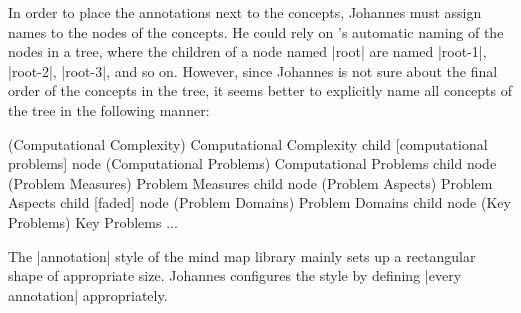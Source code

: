 In order to place the annotations next to the concepts, Johannes must
assign names to the nodes of the concepts. He could rely on
\tikzname's automatic naming of the nodes in a tree, where the
children of a node named |root| are named |root-1|, |root-2|,
|root-3|, and so on. However, since Johannes is not sure about the
final order of the concepts in the tree, it seems better to explicitly
name all concepts of the tree in the following manner:

\begin{codeexample}
 (Computational Complexity) {Computational Complexity} 
  child [computational problems] { node (Computational Problems) {Computational Problems}
    child         { node (Problem Measures) {Problem Measures} }
    child         { node (Problem Aspects) {Problem Aspects} }
    child [faded] { node (Problem Domains) {Problem Domains} }
    child         { node (Key Problems) {Key Problems} }
  }
...
\end{codeexample}

The |annotation| style of the mind map library mainly sets up a
rectangular shape of appropriate size. Johannes configures the style
by defining |every annotation| appropriately.

